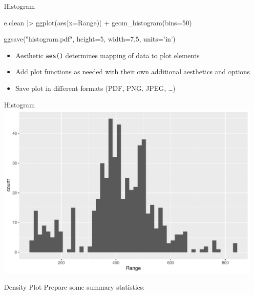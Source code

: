 \documentclass[ignorenonframetext,xcolor=x11names]{beamer}
\begin{document}
\begin{frame}[fragile]{Histogram}
\small
\begin{Rcode}
e.clean |>
  ggplot(aes(x=Range)) + 
    geom_histogram(bins=50)
    
ggsave("histogram.pdf", 
       height=5, width=7.5, units='in')
\end{Rcode}
\normalsize

\begin{itemize}
  \item Aesthetic \texttt{aes()} determines mapping of data to plot elements
  \item Add plot functions as needed with their own additional aesthetics and options
  \item Save plot in different formats (PDF, PNG, JPEG, \ldots)
\end{itemize}
\end{frame}

\begin{frame}{Histogram}
  \includegraphics[width=\textwidth]{histogram.pdf}
\end{frame}

\begin{frame}[fragile]{Density Plot}
Prepare some summary statistics:

\small
{}
\end{frame}
\end{document}
